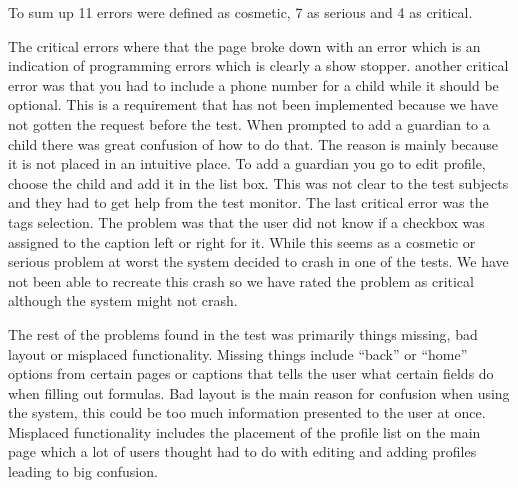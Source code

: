 To sum up 11 errors were defined as cosmetic, 7 as serious and 4 as critical. 

The critical errors where that the page broke down with an error which is an indication of programming errors which is clearly a show stopper. another critical error was that you had to include a phone number for a child while it should be optional. This is a requirement that has not been implemented because we have not gotten the request before the test. When prompted to add a guardian to a child there was great confusion of how to do that. The reason is mainly because it is not placed in an intuitive place. To add a guardian you go to edit profile, choose the child and add it in the list box. This was not clear to the test subjects and they had to get help from the test monitor. The last critical error was the tags selection. The problem was that the user did not know if a checkbox was assigned to the caption left or right for it. While this seems as a cosmetic or serious problem at worst the system decided to crash in one of the tests. We have not been able to recreate this crash so we have rated the problem as critical although the system might not crash.

The rest of the problems found in the test was primarily things missing, bad layout or misplaced functionality. Missing things include ``back'' or ``home'' options from certain pages or captions that tells the user what certain fields do when filling out formulas. Bad layout is the main reason for confusion when using the system, this could be too much information presented to the user at once. Misplaced functionality includes the placement of the profile list on the main page which a lot of users thought had to do with editing and adding profiles leading to big confusion. 